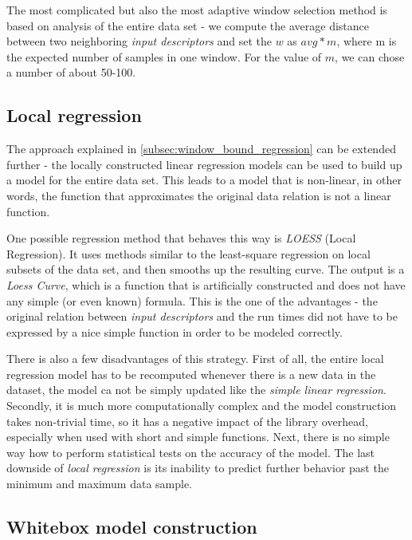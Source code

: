 The most complicated but also the most adaptive window selection method is based on analysis of the entire data set - we compute the average distance between two neighboring \textit{input descriptors} and set the $w$ as $avg * m$, where m is the expected number of samples in one window. For the value of $m$, we can chose a number of about 50-100.

\subsection{Local regression}

The approach explained in \ref{subsec:window_bound_regression} can be extended further - the locally constructed linear regression models can be used to build up a model for the entire data set. This leads to a model that is non-linear, in other words, the function that approximates the original data relation is not a linear function.

One possible regression method that behaves this way is \textit{LOESS} (Local Regression). It uses methods similar to the least-square regression on local subsets of the data set, and then smooths up the resulting curve. The output is a \textit{Loess Curve}, which is a function that is artificially constructed and does not have any simple (or even known) formula. This is the one of the advantages - the original relation between \textit{input descriptors} and the run times did not have to be expressed by a nice simple function in order to be modeled correctly.


There is also a few disadvantages of this strategy. First of all, the entire local regression model has to be recomputed whenever there is a new data in the dataset, the model ca not be simply updated like the \textit{simple linear regression}. Secondly, it is much more computationally complex and the model construction takes non-trivial time, so it has a negative impact of the library overhead, especially when used with short and simple functions. Next, there is no simple way how to perform statistical tests on the accuracy of the model. The last downside of \textit{local regression} is its inability to predict further behavior past the minimum and maximum data sample.

\subsection{Whitebox model construction}

